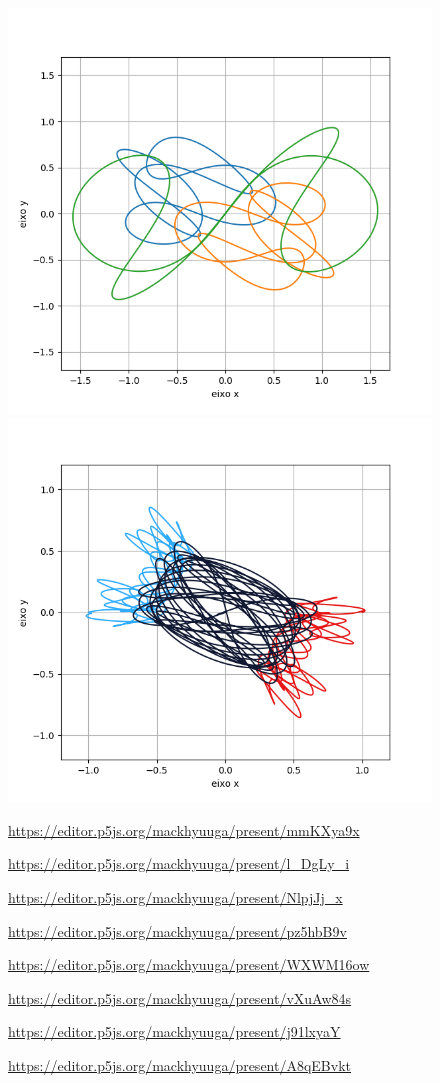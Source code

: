 \documentclass[a4paper.12pt]{article}
\begin{document}
	\begin{figure}[H]
		\includegraphics[scale=0.5]{Figure_11.png}
		\includegraphics[scale=0.5]{Figure_10.png}
		\caption{\url{https://editor.p5js.org/mackhyuuga/present/mmKXya9x}}
		\caption{\url{https://editor.p5js.org/mackhyuuga/present/l_DgLy_i
		}}
		\caption{\url{https://editor.p5js.org/mackhyuuga/present/NlpjJj_x}}
		\caption{\url{https://editor.p5js.org/mackhyuuga/present/pz5hbB9v}}
		\caption{\url{https://editor.p5js.org/mackhyuuga/present/WXWM16ow}}
		\caption{\url{https://editor.p5js.org/mackhyuuga/present/vXuAw84s}}
		\caption{\url{https://editor.p5js.org/mackhyuuga/present/j91lxyaY}}
		\caption{\url{https://editor.p5js.org/mackhyuuga/present/A8qEBvkt}}
	\end{figure}	
	
\end{document}

